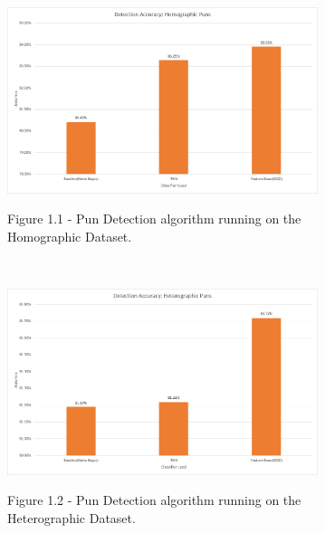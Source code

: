 \documentclass[final]{beamer}
\newlength{\onecolwid}
\newlength{\twocolwid}
\begin{document}
\begin{frame}[t]
\begin{columns}[t]
\begin{column}{\twocolwid}
\begin{columns}[t,totalwidth=\twocolwid]
\begin{column}{\onecolwid}

\end{column} %

\begin{column}{\onecolwid}\vspace{-.6in} %

\begin{figure}
\includegraphics[width=0.85\textwidth]{HomographicDetection.png}\\
\caption{Figure 1.1 - Pun Detection algorithm running on the Homographic Dataset.}
\end{figure}
\\
\vspace{20mm}
\begin{figure}
\includegraphics[width=0.85\textwidth]{HeterographicDetection.png}\\
\caption{Figure 1.2 - Pun Detection algorithm running on the Heterographic Dataset.}
\end{figure}




\end{column}
\end{columns}
\end{column}
\end{columns}
\end{frame}
\end{document}
